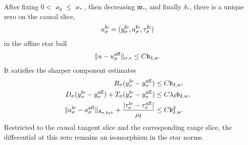 \begin{theorem}
After fixing \(0<\varkappa_0\le\varkappa_*\), then decreasing
\(\mathfrak w_*\), and finally \(\delta_*\), there is a unique zero on
the causal slice,
\begin{equation}
 u_\sigma^{\rm fe}
 =(y_\sigma^{\rm fe},a_\sigma^{\rm fe},
          \tau_\sigma^{\rm fe})                 \label{eq:fixed-envelope-nonlinear-zero}
\end{equation}
in the affine star ball
\begin{equation}
 \|u-u_\sigma^{\rm aff}\|_{\sigma,*}
 \le C\mathfrak b_{\delta,\varkappa}.           \label{eq:fixed-envelope-zero-star-radius}
\end{equation}
It satisfies the sharper component estimates
\begin{align}
 B_\sigma(y_\sigma^{\rm fe}-y_\sigma^{\rm aff})
 &\le C\mathfrak b_{\delta,\varkappa},\notag\\
 D_\sigma(y_\sigma^{\rm fe}-y_\sigma^{\rm aff})
 +T_\sigma(y_\sigma^{\rm fe}-y_\sigma^{\rm aff})
 &\le C\lambda_\delta\mathfrak b_{\delta,\varkappa},\notag\\
 \|a_\sigma^{\rm fe}-a_\sigma^{\rm aff}\|_
       {\mathsf A_{\sigma,\mathrm{hyb}}}
 +\frac{|\tau_\sigma^{\rm fe}-\tau_\sigma^{\rm aff}|}
       {\rho_\delta}
 &\le C\mathfrak b_{\delta,\varkappa}^2.       \label{eq:fixed-envelope-zero-component-correction}
\end{align}
Restricted to the causal tangent slice and the corresponding range slice,
the differential at this zero remains an isomorphism in the star norms.


\end{theorem}
